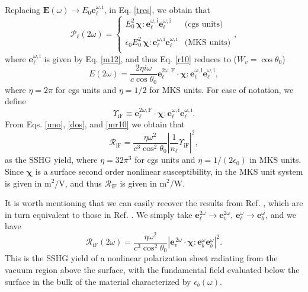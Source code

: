 Replacing $\mathbf{E}(\omega)\to E_0\mathbf{e}^{\omega,\mathrm{i}}_\ell$,  
in Eq. \eqref{tres}, we obtain that
\begin{equation}\label{m4}
\boldsymbol{\mathcal{P}}_\ell(2\omega) = 
\left\{
\begin{array}{cc}  
E^{2}_{0}\,\boldsymbol{\chi}:
\mathbf{e}^{\omega,\mathrm{i}}_{\ell}\mathbf{e}^{\omega,\mathrm{i}}_{\ell}
& \text{(cgs units)} \\\\
\epsilon_{0}E^{2}_{0}\,\boldsymbol{\chi}:
\mathbf{e}^{\omega,\mathrm{i}}_{\ell}\mathbf{e}^{\omega,\mathrm{i}}_{\ell}
& \text{(MKS units)} \\
\end{array}
\right.,
\end{equation}
where $\mathbf{e}^{\omega,\mathrm{i}}_{\ell}$ is given by Eq. \eqref{m12},
and thus
Eq. \eqref{r10} reduces to ($W_{v}=\cos\theta_{0}$)
\begin{equation}\label{mr10}
E(2\omega) =
\frac{2\eta i \omega}{c\cos\theta_{0}}
\mathbf{e}^{2\omega,\mathrm{F}}_{\ell}\cdot\boldsymbol{\chi}:
\mathbf{e}^{\omega,\mathrm{i}}_{\ell}\mathbf{e}^{\omega,\mathrm{i}}_{\ell}
,
\end{equation}
where $\eta=2\pi$ for cgs units and $\eta=1/2$ for MKS units. For ease of
notation, we define
\begin{equation}\label{mc0}
\Upsilon_{\mathrm{iF}}
\equiv 
\mathbf{e}^{2\omega,\mathrm{F}}_{\ell}\cdot\boldsymbol{\chi}:
\mathbf{e}^{\omega,\mathrm{i}}_{\ell}\mathbf{e}^{\omega,\mathrm{i}}_{\ell}
.
\end{equation}
From Eqs. \eqref{uno},
\eqref{dos}, and \eqref{mr10} we obtain that
\begin{equation}\label{mc6}
\mathcal{R}_{\mathrm{iF}}
=\frac{\eta\omega^{2}}{c^{3}\cos^{2}\theta_{0}}
\left\vert  
\frac{1}{n_{\ell}}
\Upsilon_{\mathrm{iF}}
\right\vert^{2},
\end{equation}
as the SSHG yield, where $\eta =32\pi^3$ for cgs units and
$\eta=1/(2\epsilon_0)$ in MKS units. Since $\boldsymbol{\chi}$ is a surface
second order nonlinear susceptibility, in the MKS unit system is given in
$\mathrm{m}^{2}/\mathrm{V}$, and thus $\mathcal{R}_{\mathrm{iF}}$ is given in
$\mathrm{m}^{2}/\mathrm{W}$.

It is worth mentioning that we can easily recover the results from Ref.
\cite{mizrahiJOSA88}, which are in turn equivalent to those in Ref.
\cite{sipePRB87}. We simply take
$\mathbf{e}^{2\omega}_{\ell}\to\mathbf{e}^{2\omega}_{v}$,
$\mathbf{e}^{\omega}_{\ell}\to\mathbf{e}^{\omega}_{b}$, and we have
\begin{equation}\label{eq:m69}
\mathcal{R}_{\mathrm{iF}}(2\omega) =
\frac{\eta\omega^{2}}{c^{3}\cos^{2}\theta_{0}}
\left\vert\mathbf{e}^{\,2\omega}_{v}\cdot
\boldsymbol{\chi}:\mathbf{e}^{\omega}_{b}\mathbf{e}^{\omega}_{b}
\right\vert^{2}.
\end{equation}
This is the SSHG yield  of a nonlinear polarization sheet radiating from the
vacuum region above the surface, with the fundamental field evaluated below the
surface in the bulk of the material characterized by $\epsilon_{b}(\omega)$.


